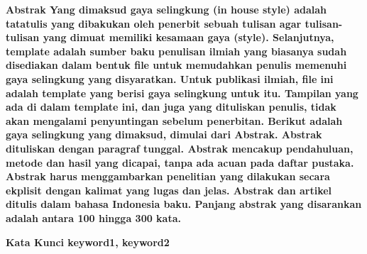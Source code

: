 \textbf{Abstrak \textemdash Yang dimaksud gaya selingkung (in house style) adalah tatatulis yang dibakukan oleh penerbit sebuah tulisan agar tulisan-tulisan yang dimuat memiliki kesamaan gaya (style). Selanjutnya, template adalah sumber baku penulisan ilmiah yang biasanya sudah disediakan dalam bentuk file untuk memudahkan penulis memenuhi gaya selingkung yang disyaratkan. Untuk publikasi ilmiah, file ini adalah template yang berisi gaya selingkung untuk itu. Tampilan yang ada di dalam template ini, dan juga yang dituliskan penulis, tidak akan mengalami penyuntingan sebelum penerbitan. Berikut adalah gaya selingkung yang dimaksud, dimulai dari Abstrak. Abstrak dituliskan dengan paragraf tunggal. Abstrak mencakup pendahuluan, metode dan hasil yang dicapai, tanpa ada acuan pada daftar pustaka. Abstrak harus menggambarkan penelitian yang dilakukan secara ekplisit dengan kalimat yang lugas dan jelas. Abstrak dan artikel ditulis dalam bahasa Indonesia baku.  Panjang abstrak yang disarankan adalah antara 100 hingga 300 kata.}\par\vspace{0.5\baselineskip}
\textbf{Kata Kunci \textemdash keyword1, keyword2}
